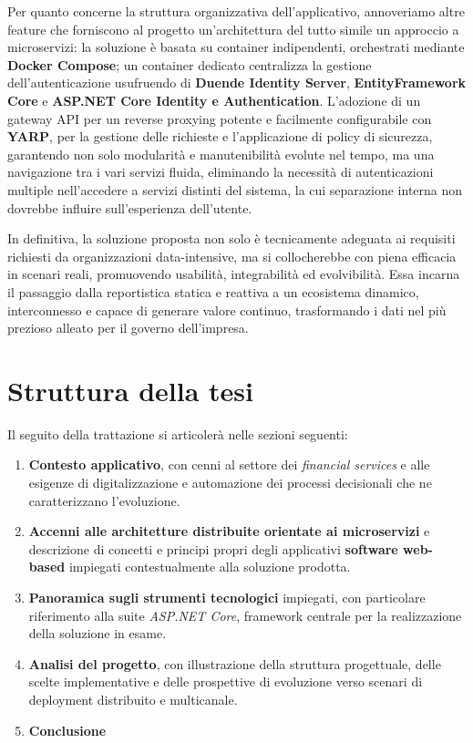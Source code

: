 Per quanto concerne la struttura organizzativa dell'applicativo, annoveriamo altre feature che forniscono al progetto un'architettura del tutto simile un approccio a microservizi: la soluzione è basata su container indipendenti, orchestrati mediante \textbf{Docker Compose}; un container dedicato centralizza la gestione dell'autenticazione usufruendo di \textbf{Duende Identity Server}, \textbf{EntityFramework Core} e \textbf{ASP.NET Core Identity e Authentication}. L'adozione di un gateway API per un reverse proxying potente e facilmente configurabile con \textbf{YARP}, per la gestione delle richieste e l'applicazione di policy di sicurezza, garantendo non solo modularità e manutenibilità evolute nel tempo, ma una navigazione tra i vari servizi fluida, eliminando la necessità di autenticazioni multiple nell'accedere a servizi distinti del sistema, la cui separazione interna non dovrebbe influire sull'esperienza dell'utente.

In definitiva, la soluzione proposta non solo è tecnicamente adeguata ai requisiti richiesti da organizzazioni data-intensive, ma si collocherebbe con piena efficacia in scenari reali, promuovendo usabilità, integrabilità ed evolvibilità. Essa incarna il passaggio dalla reportistica statica e reattiva a un ecosistema dinamico, interconnesso e capace di generare valore continuo, trasformando i dati nel più prezioso alleato per il governo dell’impresa.

\section{Struttura della tesi}
Il seguito della trattazione si articolerà nelle sezioni seguenti:

\begin{enumerate}
	\item \textbf{Contesto applicativo}, con cenni al settore dei \emph{financial services} e alle esigenze di digitalizzazione e automazione dei processi decisionali che ne caratterizzano l'evoluzione.
	\item \textbf{Accenni alle architetture distribuite orientate ai microservizi} e descrizione di concetti e principi propri degli applicativi \textbf{software web-based} impiegati contestualmente alla soluzione prodotta.
	\item \textbf{Panoramica sugli strumenti tecnologici} impiegati, con particolare riferimento alla suite \emph{ASP.NET Core}, framework centrale per la realizzazione della soluzione in esame.
	\item \textbf{Analisi del progetto}, con illustrazione della struttura progettuale, delle scelte implementative e delle prospettive di evoluzione verso scenari di deployment distribuito e multicanale.
	\item \textbf{Conclusione}
\end{enumerate}

